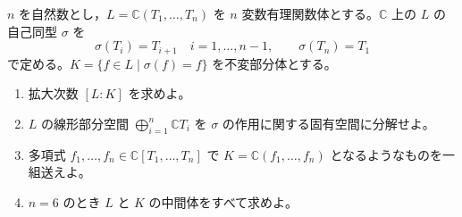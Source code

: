 \documentclass[12pt]{jlreq}
\newcommand{\C}{\mathbb{C}}
\begin{document}
$n$ を自然数とし，$L=\C(T_1,\ldots,T_n)$ を $n$ 変数有理関数体とする。$\C$ 上の $L$ の自己同型 $\sigma$ を
\[
  \sigma(T_i)=T_{i+1}\quad i=1,\ldots,n-1, \qquad \sigma(T_n)=T_1
\]
で定める。$K=\{f\in L\mid \sigma(f)=f\}$ を不変部分体とする。

\begin{enumerate}
  \item 拡大次数 $[L:K]$ を求めよ。
  \item $L$ の線形部分空間 $\bigoplus_{i=1}^{n}\C T_i$ を $\sigma$ の作用に関する固有空間に分解せよ。
  \item 多項式 $f_1,\ldots,f_n \in \C[T_1,\ldots,T_n]$ で $K=\C(f_1,\ldots,f_n)$ となるようなものを一組送えよ。
  \item $n=6$ のとき $L$ と $K$ の中間体をすべて求めよ。
\end{enumerate}
\end{document}
